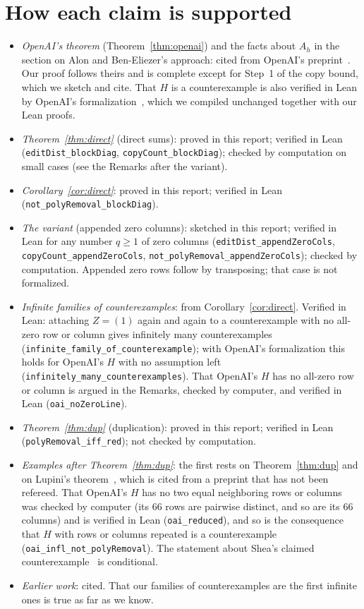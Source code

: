 \documentclass{article}
\theoremstyle{plain}
\theoremstyle{definition}
\begin{document}
\section*{How each claim is supported}

\begingroup\raggedright %
\begin{itemize}
\item \emph{OpenAI's theorem} (Theorem~\ref{thm:openai}) and the facts about $A_h$ in the section
on Alon and Ben-Eliezer's approach: cited from OpenAI's preprint~\cite{openai}. Our proof follows
theirs and is complete except for Step~1 of the copy bound, which we sketch and cite. That $H$ is a
counterexample is also verified in Lean by OpenAI's formalization~\cite{openaiLean}, which we
compiled unchanged together with our Lean proofs.
\item \emph{Theorem~\ref{thm:direct}} (direct sums): proved in this report; verified in Lean
(\texttt{editDist\_blockDiag}, \texttt{copyCount\_blockDiag}); checked by computation on small
cases (see the Remarks after the variant).
\item \emph{Corollary~\ref{cor:direct}}: proved in this report; verified in Lean
(\texttt{not\_polyRemoval\_blockDiag}).
\item \emph{The variant} (appended zero columns): sketched in this report; verified in Lean for
any number $q \ge 1$ of zero columns (\texttt{editDist\_appendZeroCols},
\texttt{copyCount\_appendZeroCols}, \texttt{not\_polyRemoval\_appendZeroCols}); checked by
computation. Appended zero rows follow by transposing; that case is not formalized.
\item \emph{Infinite families of counterexamples}: from Corollary~\ref{cor:direct}. Verified in
Lean: attaching $Z = (1)$ again and again to a counterexample with no all-zero row or column gives
infinitely many counterexamples (\texttt{infinite\_family\_of\_counterexample}); with OpenAI's
formalization this holds for OpenAI's $H$ with no assumption left
(\texttt{infinitely\_many\_counterexamples}). That OpenAI's $H$ has no all-zero row or column is
argued in the Remarks, checked by computer, and verified in Lean (\texttt{oai\_noZeroLine}).
\item \emph{Theorem~\ref{thm:dup}} (duplication): proved in this report; verified in Lean
(\texttt{polyRemoval\_iff\_red}); not checked by computation.
\item \emph{Examples after Theorem~\ref{thm:dup}}: the first rests on Theorem~\ref{thm:dup} and
on Lupini's theorem~\cite{Lupini}, which is cited from a preprint that has not been refereed. That
OpenAI's $H$ has no two equal neighboring rows or columns was checked by computer (its $66$ rows
are pairwise distinct, and so are its $66$ columns) and is verified in Lean
(\texttt{oai\_reduced}), and so is the consequence that $H$ with rows or columns repeated is a
counterexample (\texttt{oai\_infl\_not\_polyRemoval}). The statement about Shea's claimed
counterexample~\cite{shea} is conditional.
\item \emph{Earlier work}: cited. That our families of counterexamples are the first infinite
ones is true as far as we know.
\end{itemize}
\end{document}
